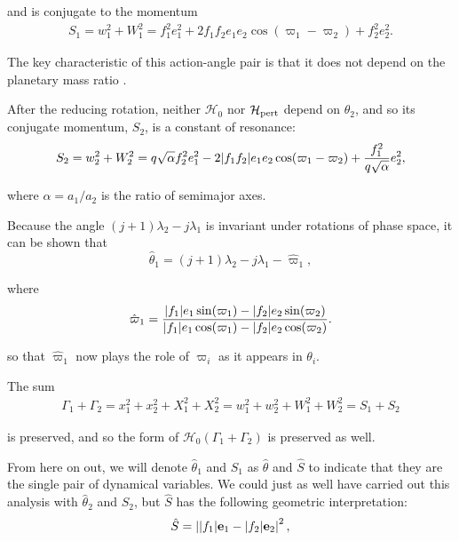 \documentclass[usenatbib,twocolumn]{mnras}
\DeclarePairedDelimiter{\abs}{|}{|}
\begin{document}
\noindent
and is conjugate to the momentum
\begin{align}
  S_1 = w_1^2 + W_1^2 = f_1^2e_1^2
  + 2f_1f_2e_1e_2\cos(\varpi_1 - \varpi_2) + f_2^2e_2^2.
\end{align}

\noindent
The key characteristic of this action-angle pair is that it does not depend
on the planetary mass ratio \citep[e.g.][]{deck13_first_order_reson_overl_stabil}.

After the reducing rotation, neither \(\mathcal H_0\) nor \(\mathcal
H_{\rm pert}\) depend on \(\hat\theta_2\), and so its conjugate momentum,
\(S_2\), is a constant of resonance:
\begin{align}
\label{eq:appS2deriv}
  S_2 = w_2^2 + W_2^2 = q\sqrt{\alpha}f_2^2e_1^2
-2\abs{f_1f_2}e_1e_2\cos(\varpi_1-\varpi_2) + \frac{f_1^2}{q\sqrt\alpha}e_2^2
,
\end{align}

\noindent
where \(\alpha=a_1/a_2\) is the ratio of semimajor axes.

Because the angle \((j+1)\lambda_2-j\lambda_1\) is
invariant under rotations of phase space,
it can be shown that
\begin{equation}
  \hat{\theta}_1 = (j+1)\lambda_2-j\lambda_1
  - \hat\varpi_1,
\end{equation}

\noindent
where
\begin{equation}
\hat\varpi_1 = \frac{\abs{f_1} e_1\sin(\varpi_1) -
  \abs{f_2}e_2\sin(\varpi_2)} {\abs{f_1}e_1\cos(\varpi_1) -
  \abs{f_2}e_2\cos(\varpi_2)}.
\end{equation}

\noindent
so that \(\hat\varpi_1\) now plays the role of \(\varpi_i\) as it appears in \(\theta_i\).

The sum
\begin{align}
  \Gamma_1 +\Gamma_2 = x_1^2+x_2^2 + X_1^2 + X_2^2
  = w_1^2+w_2^2 + W_1^2 + W_2^2 = S_1 + S_2
\end{align}

\noindent
is preserved, and so the form of \(\mathcal H_0(\Gamma_1+\Gamma_2)\)
is preserved as well.

From here on out, we will denote \(\hat\theta_1\) and \(S_1\) as
\(\hat\theta\) and \(\hat S\) to indicate that they are the single pair of
dynamical variables.  We could just as well have carried out this
analysis with \(\hat\theta_2\) and \(S_2\), but \(\hat S\) has the following
geometric interpretation:
\begin{align}
  \hat S = \left\lvert \abs{f_1}\mathbf{e}_1 - \abs{f_2}\mathbf{e}_2\right\rvert^2,
\end{align}
\end{document}
